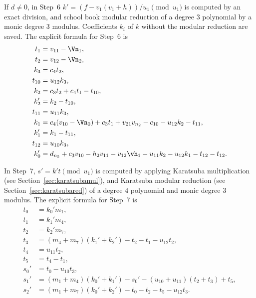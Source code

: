 If $d \neq 0$, in Step~6  $k' = (f - v_1(v_1 + h))/u_1 \pmod{u_1}$ is computed
by an exact division, and school book modular reduction of a degree 3 polynomial
by a monic degree 3 modulus. Coefficients $k_i$ of $k$ without the modular
reduction are saved. The explicit formula for Step~6 is \newpage
\begin{align*}
    t_1  &= v_{11} - \Vn_1,\\
    t_2  &= v_{12} - \Vn_2,\\
    k_3  &= c_4t_2,\\
    t_{10} &= u_{12}k_3,\\
    k_2  &= c_3t_2 + c_4t_1 - t_{10},\\
    k_2' &= k_2 - t_{10},\\
    t_{11} &= u_{11}k_3,\\
    k_1  &= c_4(v_{10} - \Vn_0) + c_3t_1 + v_{21}v_{n_2} - c_{10} - u_{12}k_2 - t_{11},\\
    k_1' &= k_1 - t_{11},\\
    t_{12} &= u_{10}k_3,\\
    k_0'  &= d_{n_5} + c_3v_{10} - h_2v_{11} - v_{12}\vh_1 - u_{11}k_2 - u_{12}k_1 - t_{12} - t_{12}.
\end{align*}

In Step~7, $s' = k't \pmod{u_1}$ is computed by applying Karatsuba
multiplication (see Section~\ref{sec:karatsubamul}), and Karatsuba modular
reduction (see Section~\ref{sec:karatsubared}) of a degree 4 polynomial and
monic degree 3 modulus. The explicit formula for Step~7 is
\begin{align*}
    t_0 &= k_0'm_1,\\
    t_1 &= k_1'm_4,\\
    t_2 &= k_2'm_7,\\
    t_3 &= (m_4 + m_7)(k_1' + k_2') - t_2 - t_1 - u_{12}t_2,\\
    t_4 &= u_{11}t_2,\\
    t_5 &= t_4 - t_1,\\
    s_0' &= t_0 - u_{10}t_3,\\
    s_1' &= (m_1 + m_4)(k_0' + k_1') - s_0' - (u_{10} + u_{11})(t_2 + t_3) + t_5,\\
    s_2' &= (m_1 + m_7)(k_0' + k_2') - t_0 - t_2 - t_5 - u_{12}t_3.
\end{align*}

